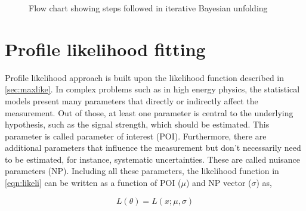 \begin{figure}
    \centering
    \caption{Flow chart showing steps followed in iterative Bayesian unfolding }
    \label{fig:5.3}
    \end{figure}

\section{Profile likelihood fitting}
\label{sec:plf}

Profile likelihood approach is built upon the likelihood function described in \cref{sec:maxlike}.
In complex problems such as in high energy physics, the statistical models present many parameters
that directly or indirectly affect the measurement. Out of those, at least one parameter is central to the 
underlying hypothesis, such as the signal strength, which should be estimated. This parameter is called parameter of interest (POI).
Furthermore, there are additional parameters that influence the measurement but don't necessarily
need to be estimated, for instance, systematic uncertainties. These are called nuisance 
parameters (NP). Including all these parameters,
the likelihood function in \cref{eqn:likeli} can be written as a function of 
POI ($\mu$) and NP vector ($\sigma$) as,

\begin{equation}
    L (\theta) = L(x;\mu,\sigma)
\end{equation}

